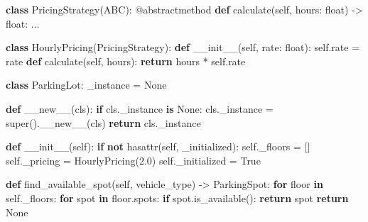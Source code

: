 \documentclass[11pt]{article}
\newenvironment{Shaded}{\begin{snugshade}}{\end{snugshade}}
\newcommand{\AttributeTok}[1]{\textcolor[rgb]{0.16,0.50,0.73}{#1}}
\newcommand{\BuiltInTok}[1]{\textcolor[rgb]{0.50,0.55,0.55}{#1}}
\newcommand{\ControlFlowTok}[1]{\textcolor[rgb]{0.99,0.74,0.29}{\textbf{#1}}}
\newcommand{\FloatTok}[1]{\textcolor[rgb]{0.96,0.45,0.00}{#1}}
\newcommand{\FunctionTok}[1]{\textcolor[rgb]{0.56,0.27,0.68}{#1}}
\newcommand{\KeywordTok}[1]{\textcolor[rgb]{0.81,0.81,0.76}{\textbf{#1}}}
\newcommand{\NormalTok}[1]{\textcolor[rgb]{0.81,0.81,0.76}{#1}}
\newcommand{\OperatorTok}[1]{\textcolor[rgb]{0.81,0.81,0.76}{#1}}
\newcommand{\StringTok}[1]{\textcolor[rgb]{0.96,0.31,0.31}{#1}}
\newcommand{\VariableTok}[1]{\textcolor[rgb]{0.15,0.68,0.68}{#1}}
\begin{document}
\begin{Shaded}
\begin{Highlighting}[]
\KeywordTok{class}\NormalTok{ PricingStrategy(ABC):}
    \AttributeTok{@abstractmethod}
    \KeywordTok{def}\NormalTok{ calculate(}\VariableTok{self}\NormalTok{, hours: }\BuiltInTok{float}\NormalTok{) }\OperatorTok{{-}\textgreater{}} \BuiltInTok{float}\NormalTok{: ...}

\KeywordTok{class}\NormalTok{ HourlyPricing(PricingStrategy):}
    \KeywordTok{def} \FunctionTok{\_\_init\_\_}\NormalTok{(}\VariableTok{self}\NormalTok{, rate: }\BuiltInTok{float}\NormalTok{): }\VariableTok{self}\NormalTok{.rate }\OperatorTok{=}\NormalTok{ rate}
    \KeywordTok{def}\NormalTok{ calculate(}\VariableTok{self}\NormalTok{, hours): }\ControlFlowTok{return}\NormalTok{ hours }\OperatorTok{*} \VariableTok{self}\NormalTok{.rate}

\KeywordTok{class}\NormalTok{ ParkingLot:}
\NormalTok{    \_instance }\OperatorTok{=} \VariableTok{None}

    \KeywordTok{def} \FunctionTok{\_\_new\_\_}\NormalTok{(cls):}
        \ControlFlowTok{if}\NormalTok{ cls.\_instance }\KeywordTok{is} \VariableTok{None}\NormalTok{:}
\NormalTok{            cls.\_instance }\OperatorTok{=} \BuiltInTok{super}\NormalTok{().}\FunctionTok{\_\_new\_\_}\NormalTok{(cls)}
        \ControlFlowTok{return}\NormalTok{ cls.\_instance}

    \KeywordTok{def} \FunctionTok{\_\_init\_\_}\NormalTok{(}\VariableTok{self}\NormalTok{):}
        \ControlFlowTok{if} \KeywordTok{not} \BuiltInTok{hasattr}\NormalTok{(}\VariableTok{self}\NormalTok{, }\StringTok{\textquotesingle{}\_initialized\textquotesingle{}}\NormalTok{):}
            \VariableTok{self}\NormalTok{.\_floors }\OperatorTok{=}\NormalTok{ []}
            \VariableTok{self}\NormalTok{.\_pricing }\OperatorTok{=}\NormalTok{ HourlyPricing(}\FloatTok{2.0}\NormalTok{)}
            \VariableTok{self}\NormalTok{.\_initialized }\OperatorTok{=} \VariableTok{True}

    \KeywordTok{def}\NormalTok{ find\_available\_spot(}\VariableTok{self}\NormalTok{, vehicle\_type) }\OperatorTok{{-}\textgreater{}}\NormalTok{ ParkingSpot:}
        \ControlFlowTok{for}\NormalTok{ floor }\KeywordTok{in} \VariableTok{self}\NormalTok{.\_floors:}
            \ControlFlowTok{for}\NormalTok{ spot }\KeywordTok{in}\NormalTok{ floor.spots:}
                \ControlFlowTok{if}\NormalTok{ spot.is\_available():}
                    \ControlFlowTok{return}\NormalTok{ spot}
        \ControlFlowTok{return} \VariableTok{None}
\end{Highlighting}
\end{Shaded}
\end{document}
